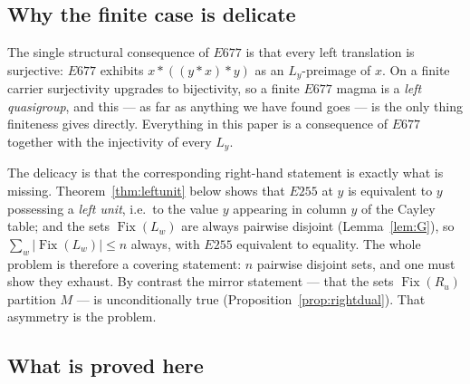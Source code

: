 \documentclass[11pt]{article}
\theoremstyle{plain}
\theoremstyle{definition}
\theoremstyle{remark}
\numberwithin{equation}{section}
\newcommand{\op}{\mathbin{*}}
\newcommand{\Fix}{\operatorname{Fix}}
\begin{document}
\subsection{Why the finite case is delicate}

The single structural consequence of $E677$ is that every left translation is surjective:
$E677$ exhibits $x\op((y\op x)\op y)$ as an $L_y$-preimage of $x$. On a finite carrier
surjectivity upgrades to bijectivity, so a finite $E677$ magma is a \emph{left quasigroup},
and this --- as far as anything we have found goes --- is the only thing finiteness gives
directly. Everything in this paper is a consequence of $E677$ together with the injectivity
of every $L_y$.

The delicacy is that the corresponding right-hand statement is exactly what is missing.
Theorem~\ref{thm:leftunit} below shows that $E255$ at $y$ is equivalent to $y$ possessing a
\emph{left unit}, i.e.\ to the value $y$ appearing in column $y$ of the Cayley table; and the
sets $\Fix(L_w)$ are always pairwise disjoint (Lemma~\ref{lem:G}), so
$\sum_w |\Fix(L_w)| \le n$ always, with $E255$ equivalent to equality. The whole problem is
therefore a covering statement: $n$ pairwise disjoint sets, and one must show they exhaust.
By contrast the mirror statement --- that the sets $\Fix(R_u)$ partition $M$ --- is
unconditionally true (Proposition~\ref{prop:rightdual}). That asymmetry is the problem.

\subsection{What is proved here}
\end{document}
